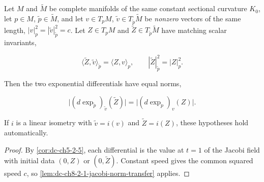\begin{lemma}
  \label{lem:dc-ch8-2-1-exp-norm-transfer}
  \leanok
  Let $M$ and $\tilde M$ be complete manifolds of the same constant sectional curvature
  $K_0$, let $p\in M$, $\tilde p\in\tilde M$, and let $v\in T_p M$, $\tilde v\in T_{\tilde p}\tilde M$
  be \emph{nonzero} vectors of the same length, $|v|_p^2=|\tilde v|_{\tilde p}^2=c$. Let
  $Z\in T_p M$ and $\tilde Z\in T_{\tilde p}\tilde M$ have matching scalar invariants,

  $$
  \langle \tilde Z,\tilde v\rangle_{\tilde p}=\langle Z,v\rangle_p,
  \qquad |\tilde Z|^2_{\tilde p}=|Z|^2_p .
  $$

  Then the two exponential differentials have equal norms,

  $$
  \big|(d\exp_{\tilde p})_{\tilde v}(\tilde Z)\big| = \big|(d\exp_p)_v(Z)\big| .
  $$

  If $i$ is a linear isometry with $\tilde v=i(v)$ and $\tilde Z=i(Z)$, these
  hypotheses hold automatically.
\end{lemma}
\begin{proof}
  \leanok
\sketch
  By \cref{cor:dc-ch5-2-5}, each differential is the value at $t=1$ of the
  Jacobi field with initial data $(0,Z)$ or $(0,\tilde Z)$. Constant speed gives the
  common squared speed $c$, so \cref{lem:dc-ch8-2-1-jacobi-norm-transfer} applies.
\end{proof}

